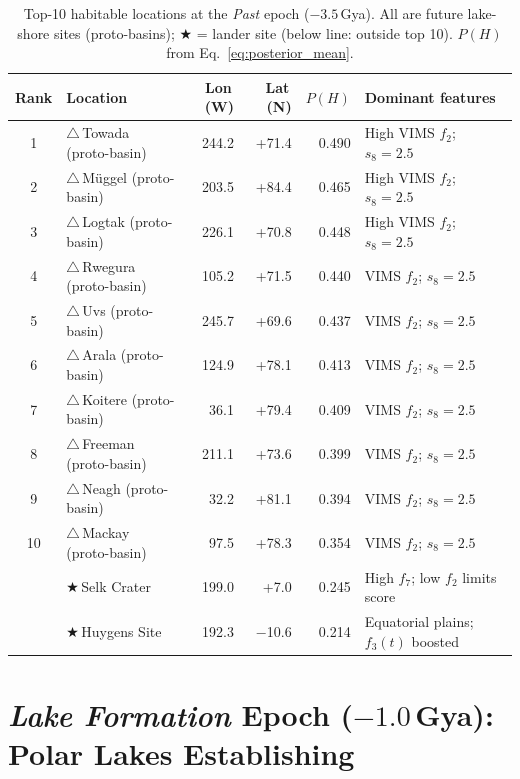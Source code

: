 \begin{table}[H]
\centering
\small
\begin{tabular}{clrrrp{4.5cm}}
\toprule
\textbf{Rank} & \textbf{Location} & \textbf{Lon\,(\textdegree{}W)} & \textbf{Lat\,(\textdegree{}N)} & \textbf{$P(H)$} & \textbf{Dominant features} \\
\midrule
1  & $\triangle$\,Towada (proto-basin)   & 244.2 & +71.4 & 0.490 & High VIMS $f_2$; $s_8{=}2.5$ \\
2  & $\triangle$\,Müggel (proto-basin)   & 203.5 & +84.4 & 0.465 & High VIMS $f_2$; $s_8{=}2.5$ \\
3  & $\triangle$\,Logtak (proto-basin)   & 226.1 & +70.8 & 0.448 & High VIMS $f_2$; $s_8{=}2.5$ \\
4  & $\triangle$\,Rwegura (proto-basin)  & 105.2 & +71.5 & 0.440 & VIMS $f_2$; $s_8{=}2.5$ \\
5  & $\triangle$\,Uvs (proto-basin)      & 245.7 & +69.6 & 0.437 & VIMS $f_2$; $s_8{=}2.5$ \\
6  & $\triangle$\,Arala (proto-basin)    & 124.9 & +78.1 & 0.413 & VIMS $f_2$; $s_8{=}2.5$ \\
7  & $\triangle$\,Koitere (proto-basin)  &  36.1 & +79.4 & 0.409 & VIMS $f_2$; $s_8{=}2.5$ \\
8  & $\triangle$\,Freeman (proto-basin)  & 211.1 & +73.6 & 0.399 & VIMS $f_2$; $s_8{=}2.5$ \\
9  & $\triangle$\,Neagh (proto-basin)    &  32.2 & +81.1 & 0.394 & VIMS $f_2$; $s_8{=}2.5$ \\
10 & $\triangle$\,Mackay (proto-basin)   &  97.5 & +78.3 & 0.354 & VIMS $f_2$; $s_8{=}2.5$ \\
\midrule
 & $\bigstar$\,Selk Crater  & 199.0 & +7.0  & 0.245 & High $f_7$; low $f_2$ limits score \\
 & $\bigstar$\,Huygens Site & 192.3 & $-$10.6 & 0.214 & Equatorial plains; $f_3(t)$ boosted \\
\bottomrule
\end{tabular}
\caption{Top-10 habitable locations at the \textit{Past} epoch ($-3.5$\,Gya).
  All are future lake-shore sites (proto-basins); $\bigstar$ = lander site (below line: outside top 10).
  $P(H)$ from Eq.~\ref{eq:posterior_mean}.}
\label{tab:top10_past}
\end{table}


\section{\textit{Lake Formation} Epoch ($-1.0$\,Gya): Polar Lakes Establishing}
\label{sec:results_lf}


